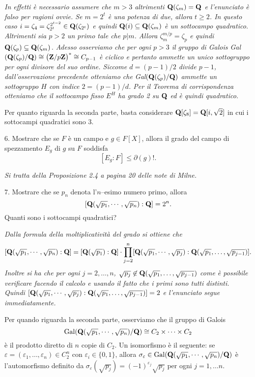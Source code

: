 \smallskip{} \it
In effetti \`e necessario assumere che $m>3$ altrimenti ${\bf
Q}(\zeta_m)={\bf Q}$ e l'enunciato \`e falso per ragioni ovvie. Se
$m=2^t$ \`e una potenza di due, allora $t\geq2$. In questo caso
$i=\zeta_4=\zeta_{2^t}^{2^{t-2}}\in{\bf Q}(\zeta_{2^t})$ e quindi
${\bf Q}(i)\subseteq{\bf Q}(\zeta_m)$ \`e un sottocampo
quadratico. Altrimenti sia $p>2$ un primo tale che $p|m$. Allora
$\zeta_m^{m/p}=\zeta_p$ e quindi ${\bf Q}(\zeta_p)\subseteq{\bf
Q}(\zeta_m)$. Adesso osserviamo che per ogni $p>3$ il gruppo di
Galois {\rm Gal}$({\bf Q}(\zeta_p)/{\bf Q})\cong \big({\bf
Z}/p{\bf Z}\big)^*\cong C_{p-1}$ \`e ciclico e pertanto ammette un
unico sottogruppo per ogni divisore del suo ordine. Siccome
$d=(p-1)/2$ divide $p-1$, dall'osservazione precedente otteniamo
che {\rm Gal}$({\bf Q}(\zeta_p)/{\bf Q})$ ammette un sottogruppo
$H$ con indice $2=(p-1)/d$. Per il Teorema di corrispondenza
otteniamo che il sottocampo fisso $E^H$ ha grado 2 su ${\bf Q}$ ed
\`{e} quindi quadratico.

Per quanto riguarda la seconda parte, basta considerare ${\bf
Q}[\zeta_8]={\bf Q}[i,\sqrt{2}]$ in cui i sottocampi quadratici sono
$3$.\rm
\bigskip\bigskip

 \item{6.} Mostrare che se $F$ \`e un campo e $g\in F[X]$, allora
il grado del campo di spezzamento $E_g$ di $g$ su $F$ soddisfa
$$[E_g:F]\leq \partial(g)!.$$

\smallskip{} \it Si tratta della Proposizione
2.4 a pagina 20 delle note di Milne. \rm \bigskip

\item{7.} Mostrare che se $p_n$ denota l'$n$--esimo numero primo, allora
$$[{\bf Q}(\sqrt{p_1},\cdots,\sqrt{p_n}):{\bf Q}]=2^n.$$ Quanti sono
i sottocampi quadratici?

\smallskip{} \it Dalla formula della
moltiplicativit\`a del grado si ottiene che
$$[{\bf Q}(\sqrt{p_1},\cdots,\sqrt{p_n}):{\bf Q}]=[{\bf Q}(\sqrt{p_1}):{\bf
Q}]\cdot \prod_{j=2}^n[{\bf Q}(\sqrt{p_1},\cdots,\sqrt{p_j}):{\bf
Q}(\sqrt{p_1},\ldots,\sqrt{p_{j-1}})].$$ Inoltre si ha che per
ogni $j=2,\ldots,n$, $\sqrt{p_j}\not\in{\bf
Q}(\sqrt{p_1},\ldots,\sqrt{p_{j-1}})$ come \`{e} possibile
verificare facendo il calcolo e usando il fatto che i primi sono
tutti distinti. Quindi $[{\bf
Q}(\sqrt{p_1},\cdots,\sqrt{p_j}):{\bf
Q}(\sqrt{p_1},\ldots,\sqrt{p_{j-1}})]=2$ e l'enunciato segue
immediatamente.

Per quando riguarda la seconda parte, osserviamo che il gruppo di
Galois
$${\rm Gal}({\bf Q}(\sqrt{p_1},\cdots,\sqrt{p_n})/{\bf Q})\cong
C_2\times \cdots\times C_2$$ \`{e} il prodotto diretto di $n$
copie di $C_2$. Un isomorfismo \`e il seguente: se
$\varepsilon=(\varepsilon_1,\ldots,\varepsilon_n)\in C_2^n$ con
$\varepsilon_i\in\{0,1\}$, allora $\sigma_\varepsilon\in{\rm
Gal}({\bf Q}(\sqrt{p_1},\cdots,\sqrt{p_n})/{\bf Q})$ \`{e}
l'au\-to\-mor\-fis\-mo definito da
$\sigma_\varepsilon(\sqrt{p_j})=(-1)^{\varepsilon_j} \sqrt{p_j}$
per ogni $j=1,\ldots n$.

